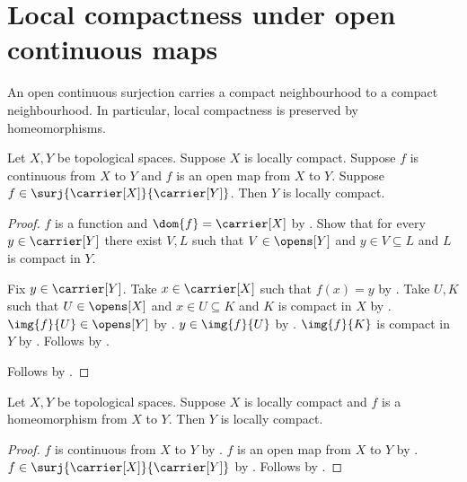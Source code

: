 \section{Local compactness under open continuous maps}




An open continuous surjection carries a compact neighbourhood to a compact
neighbourhood. In particular, local compactness is preserved by homeomorphisms.

\begin{theorem}\label{open_continuous_surjection_preserves_local_compactness}
    Let $X,Y$ be topological spaces.
    Suppose $X$ is locally compact.
    Suppose $f$ is continuous from $X$ to $Y$ and $f$ is an open map from $X$ to $Y$.
    Suppose $f\in\surj{\carrier[X]}{\carrier[Y]}$.
    Then $Y$ is locally compact.
\end{theorem}
\begin{proof}
    $f$ is a function and $\dom{f}=\carrier[X]$ by
        .
    Show that for every $y\in\carrier[Y]$ there exist $V,L$ such that
        $V\in\opens[Y]$ and $y\in V\subseteq L$ and $L$ is compact in $Y$.
    \begin{subproof}
        Fix $y\in\carrier[Y]$.
        Take $x\in\carrier[X]$ such that $f(x)=y$ by .
        Take $U,K$ such that $U\in\opens[X]$ and $x\in U\subseteq K$ and
            $K$ is compact in $X$ by .
        $\img{f}{U}\in\opens[Y]$ by .
        $y\in\img{f}{U}$ by .
        $\img{f}{K}$ is compact in $Y$ by .
        Follows by .
    \end{subproof}
    Follows by .
\end{proof}

\begin{corollary}\label{homeomorphism_preserves_local_compactness}
    Let $X,Y$ be topological spaces.
    Suppose $X$ is locally compact and $f$ is a homeomorphism from $X$ to $Y$.
    Then $Y$ is locally compact.
\end{corollary}
\begin{proof}
    $f$ is continuous from $X$ to $Y$ by .
    $f$ is an open map from $X$ to $Y$ by .
    $f\in\surj{\carrier[X]}{\carrier[Y]}$ by .
    Follows by .
\end{proof}
